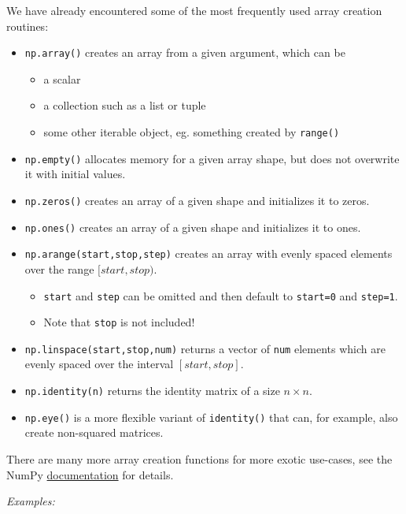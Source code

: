 \documentclass[10pt]{scrartcl}
\providecommand{\tightlist}{%
      \setlength{\itemsep}{0pt}\setlength{\parskip}{0pt}}
\begin{document}
We have already encountered some of the most frequently used array
creation routines:

\begin{itemize}
\tightlist
\item
  \texttt{np.array()} creates an array from a given argument, which can
  be

  \begin{itemize}
  \tightlist
  \item
    a scalar
  \item
    a collection such as a list or tuple
  \item
    some other iterable object, eg. something created by
    \texttt{range()}
  \end{itemize}
\item
  \texttt{np.empty()} allocates memory for a given array shape, but does
  not overwrite it with initial values.
\item
  \texttt{np.zeros()} creates an array of a given shape and initializes
  it to zeros.
\item
  \texttt{np.ones()} creates an array of a given shape and initializes
  it to ones.
\item
  \texttt{np.arange(start,stop,step)} creates an array with evenly
  spaced elements over the range \([start,stop)\).

  \begin{itemize}
  \tightlist
  \item
    \texttt{start} and \texttt{step} can be omitted and then default to
    \texttt{start=0} and \texttt{step=1}.
  \item
    Note that \texttt{stop} is not included!
  \end{itemize}
\item
  \texttt{np.linspace(start,stop,num)} returns a vector of \texttt{num}
  elements which are evenly spaced over the interval \([start,stop]\).
\item
  \texttt{np.identity(n)} returns the identity matrix of a size
  \(n \times n\).
\item
  \texttt{np.eye()} is a more flexible variant of \texttt{identity()}
  that can, for example, also create non-squared matrices.
\end{itemize}

There are many more array creation functions for more exotic use-cases,
see the NumPy
\href{https://numpy.org/doc/stable/reference/routines.array-creation.html}{documentation}
for details.

\emph{Examples:}
\end{document}

